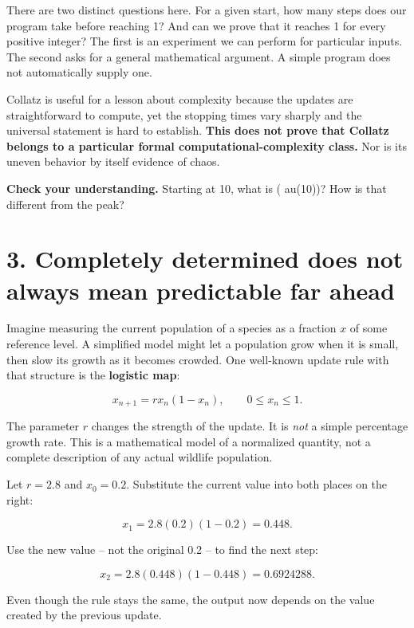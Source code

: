 \documentclass[11pt,letterpaper]{article}
\begin{document}
There are two distinct questions here. For a given start, how many steps does our program take before reaching 1? And can we prove that it reaches 1 for every positive integer? The first is an experiment we can perform for particular inputs. The second asks for a general mathematical argument. A simple program does not automatically supply one.



Collatz is useful for a lesson about complexity because the updates are straightforward to compute, yet the stopping times vary sharply and the universal statement is hard to establish. \textbf{This does not prove that Collatz belongs to a particular formal computational-complexity class.} Nor is its uneven behavior by itself evidence of chaos.



\begin{tcolorbox}[title={Pause and try 2},breakable]
\textbf{Check your understanding.} Starting at 10, what is (	au(10))? How is that different from the peak?
\end{tcolorbox}


\clearpage


\section{3. Completely determined does not always mean predictable far ahead}


Imagine measuring the current population of a species as a fraction \(x\) of some reference level. A simplified model might let a population grow when it is small, then slow its growth as it becomes crowded. One well-known update rule with that structure is the \textbf{logistic map}:


\[x_{n+1}=r x_n(1-x_n),\qquad 0\leq x_n\leq1.\]

The parameter \(r\) changes the strength of the update. It is \emph{not} a simple percentage growth rate. This is a mathematical model of a normalized quantity, not a complete description of any actual wildlife population.



\begin{tcolorbox}[title={Calculate the first two updates},breakable]

Let \(r=2.8\) and \(x_0=0.2\). Substitute the current value into both places on the right:



\[x_1=2.8(0.2)(1-0.2)=0.448.\]



Use the new value -- not the original 0.2 -- to find the next step:



\[x_2=2.8(0.448)(1-0.448)=0.6924288.\]



Even though the rule stays the same, the output now depends on the value created by the previous update.


\end{tcolorbox}
\end{document}
